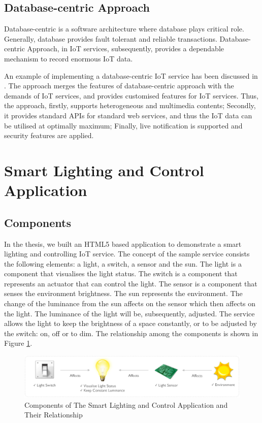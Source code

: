 \subsection{Database-centric Approach}
Database-centric is a software architecture where database plays critical role. Generally, database provides fault tolerant and reliable transactions. Database-centric Approach, in IoT services, subsequently, provides a dependable mechanism to record enormous IoT data. 

An example of implementing a database-centric IoT service has been discussed in \cite{francesco2012storage}. The approach merges the features of database-centric approach with the demands of IoT services, and provides customised features for IoT services. Thus, the approach, firstly, supports heterogeneous and multimedia contents; Secondly, it provides standard APIs for standard web services, and thus the IoT data can be utilised at optimally maximum; Finally, live notification is supported and security features are applied.

\section{Smart Lighting and Control Application}
\subsection{Components}
In the thesis, we built an HTML5 based application to demonstrate a smart lighting and controlling IoT service. The concept of the sample service consists the following elements: a light, a switch, a sensor and the sun. The light is a component that visualises the light status. The switch is a component that represents an actuator that can control the light. The sensor is a component that senses the environment brightness. The sun represents the environment. The change of the luminance from the sun affects on the sensor which then affects on the light. The luminance of the light will be, subsequently, adjusted. The service allows the light to keep the brightness of a space constantly, or to be adjusted by the switch: on, off or to dim. The relationship among the components is shown in Figure \ref{fig:components-relationship}. 

\begin{figure}[ht]
  \begin{center}
    \includegraphics[width=1\textwidth]{images/components-relationship.pdf}
    \caption{Components of The Smart Lighting and Control Application and Their Relationship}
    \label{fig:components-relationship}
  \end{center}
\end{figure}

